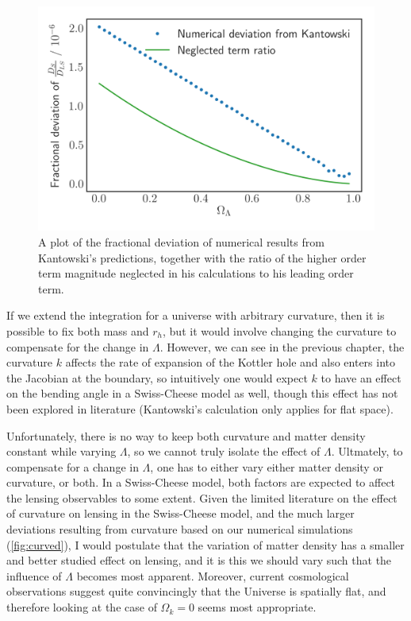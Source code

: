 \begin{figure}
  \centering
  \includegraphics[height=0.5\linewidth]{images/flat-neglected_const_rh.png}
  \caption{A plot of the fractional deviation of numerical results from Kantowski's predictions, together with the ratio of the higher order term magnitude neglected in his calculations to his leading order term. }
  \label{fig:flat-const-rh-neglected}
\end{figure}

If we extend the integration for a universe with arbitrary curvature, then it is possible to fix both mass and $r_h$, but it would involve changing the curvature to compensate for the change in $\Lambda$. However, we can see in the previous chapter, the curvature $k$ affects the rate of expansion of the Kottler hole and also enters into the Jacobian at the boundary, so intuitively one would expect $k$ to have an effect on the bending angle in a Swiss-Cheese model as well, though this effect has not been explored in literature (Kantowski's calculation \citet{kantowski2010gravitational} only applies for flat space). 

Unfortunately, there is no way to keep both curvature and matter density constant while varying $\Lambda$, so we cannot truly isolate the effect of $\Lambda$. Ultmately, to compensate for a change in $\Lambda$, one has to either vary either matter density or curvature, or both. In a Swiss-Cheese model, both factors are expected to affect the lensing observables to some extent. Given the limited literature on the effect of curvature on lensing in the Swiss-Cheese model, and the much larger deviations resulting from curvature based on our numerical simulations (\autoref{fig:curved}), I would postulate that the variation of matter density has a smaller and better studied effect on lensing, and it is this we should vary such that the influence of $\Lambda$ becomes most apparent. Moreover, current cosmological observations \citep{ade2016planck,hinshaw2013nine,de2000flat} suggest quite convincingly that the Universe is spatially flat, and therefore looking at the case of $\Omega_k = 0$ seems most appropriate. 


